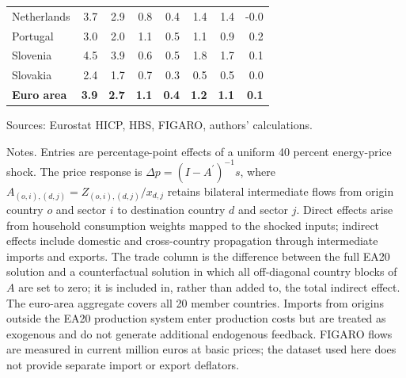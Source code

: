 \documentclass[11pt]{article}
\begin{document}
\begin{table}[H]
\begin{tabular}{lrrrrrrr}
 \\
Netherlands & 3.7 & 2.9 & 0.8 & 0.4 & 1.4 & 1.4 & -0.0
 \\
Portugal & 3.0 & 2.0 & 1.1 & 0.5 & 1.1 & 0.9 & 0.2
 \\
Slovenia & 4.5 & 3.9 & 0.6 & 0.5 & 1.8 & 1.7 & 0.1
 \\
Slovakia & 2.4 & 1.7 & 0.7 & 0.3 & 0.5 & 0.5 & 0.0
 \\
\midrule
\textbf{Euro area} & \textbf{3.9} & \textbf{2.7} & \textbf{1.1} & \textbf{0.4} & \textbf{1.2} & \textbf{1.1} & \textbf{0.1}
 \\
\bottomrule
\end{tabular}
\par\vspace{0.35em}\footnotesize\noindent Sources: Eurostat HICP, HBS, FIGARO, authors' calculations.
\par\vspace{0.25em}\footnotesize\noindent Notes. Entries are percentage-point effects of a uniform 40 percent energy-price shock. The price response is $\Delta p = (I - A^{\prime})^{-1}s$, where $A_{(o,i),(d,j)}=Z_{(o,i),(d,j)}/x_{d,j}$ retains bilateral intermediate flows from origin country $o$ and sector $i$ to destination country $d$ and sector $j$. Direct effects arise from household consumption weights mapped to the shocked inputs; indirect effects include domestic and cross-country propagation through intermediate imports and exports. The trade column is the difference between the full EA20 solution and a counterfactual solution in which all off-diagonal country blocks of $A$ are set to zero; it is included in, rather than added to, the total indirect effect. The euro-area aggregate covers all 20 member countries. Imports from origins outside the EA20 production system enter production costs but are treated as exogenous and do not generate additional endogenous feedback. FIGARO flows are measured in current million euros at basic prices; the dataset used here does not provide separate import or export deflators.
\end{table}
\vspace{0.6em}
\end{document}
